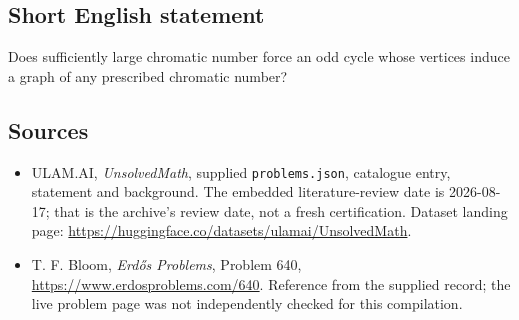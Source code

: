 \documentclass[11pt,a4paper]{article}
\begin{document}
\subsection{Short English statement}

Does sufficiently large chromatic number force an odd cycle whose vertices induce a graph of any prescribed chromatic number?

\subsection{Sources}

{\small

\begin{itemize}

\item[\hypertarget{source:statement:1}{S1}] ULAM.AI, \emph{UnsolvedMath}, supplied \texttt{problems.json}, catalogue entry, statement and background. The embedded literature-review date is 2026-08-17; that is the archive’s review date, not a fresh certification. Dataset landing page: \url{https://huggingface.co/datasets/ulamai/UnsolvedMath}.

\item[\hypertarget{source:statement:2}{S2}] T. F. Bloom, \emph{Erdős Problems}, Problem 640, \url{https://www.erdosproblems.com/640}. Reference from the supplied record; the live problem page was not independently checked for this compilation.

\end{itemize}

}

\label{end:statement}
\end{document}
